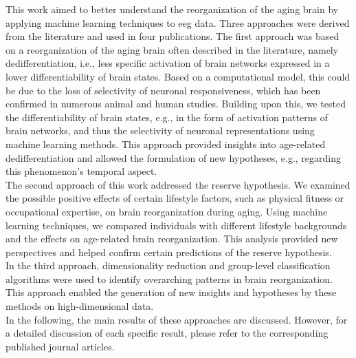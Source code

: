 This work aimed to better understand the reorganization of the aging brain by applying machine learning techniques to \gls{eeg} data. Three approaches were derived from the literature and used in four publications.
The first approach was based on a reorganization of the aging brain often described in the literature, namely dedifferentiation, i.e., less specific activation of brain networks expressed in a lower differentiability of brain states. Based on a computational model, this could be due to the loss of selectivity of neuronal responsiveness, which has been confirmed in numerous animal and human studies. Building upon this, we tested the differentiability of brain states, e.g., in the form of activation patterns of brain networks, and thus the selectivity of neuronal representations using machine learning methods. This approach provided insights into age-related dedifferentiation and allowed the formulation of new hypotheses, e.g., regarding this phenomenon's temporal aspect.\\
The second approach of this work addressed the reserve hypothesis. We examined the possible positive effects of certain lifestyle factors, such as physical fitness or occupational expertise, on brain reorganization during aging. Using machine learning techniques, we compared individuals with different lifestyle backgrounds and the effects on age-related brain reorganization. This analysis provided new perspectives and helped confirm certain predictions of the reserve hypothesis.\\
In the third approach, dimensionality reduction and group-level classification algorithms were used to identify overarching patterns in brain reorganization. This approach enabled the generation of new insights and hypotheses by these methods on high-dimensional data.\\
In the following, the main results of these approaches are discussed. However, for a detailed discussion of each specific result, please refer to the corresponding published journal articles.\\

